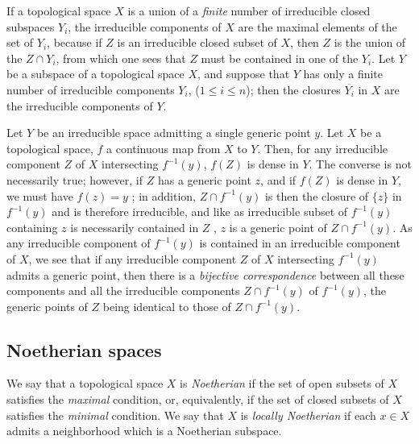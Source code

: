 \begin{env}[2.1.7]
\label{0.2.1.7}
If a topological space $X$ is a union of a {\em finite} number of irreducible
closed subspaces $Y_i$, the irreducible components of $X$ are the maximal
elements of the set of $Y_i$, because if $Z$ is an irreducible closed subset of
$X$, then $Z$ is the union of the $Z\cap Y_i$, from which one sees that $Z$ must
be contained in one of the $Y_i$. Let $Y$ be a subspace of a topological space
$X$, and suppose that $Y$ has only a finite number of irreducible components
$Y_i$, ($1\leqslant i\leqslant n$); then the closures $\overline{Y_i}$ in $X$
are the irreducible components of $Y$.
\end{env}

\begin{env}[2.1.8]
\label{0.2.1.8}
Let $Y$ be an irreducible space admitting a single generic point $y$. Let $X$ be
a topological space, $f$ a continuous map from $X$ to $Y$. Then, for any
irreducible component $Z$ of $X$ intersecting $f^{-1}(y)$, $f(Z)$ is dense in
$Y$. The converse is not necessarily true; however, if $Z$ has a generic point
$z$, and if $f(Z)$ is dense in $Y$, we must have $f(z)=y$ ; in
addition, $Z\cap f^{-1}(y)$ is then the closure of $\{z\}$ in $f^{-1}(y)$ and is
therefore irreducible, and like as irreducible subset of $f^{-1}(y)$ containing
$z$ is necessarily contained in $Z$ , $z$ is a generic point of
$Z\cap f^{-1}(y)$. As any irreducible component of $f^{-1}(y)$ is contained in
an irreducible component of $X$, we see that if any irreducible component $Z$ of
$X$ intersecting $f^{-1}(y)$ admits a generic point, then there is a
{\em bijective correspondence} between all these components and all the
irreducible components $Z\cap f^{-1}(y)$ of $f^{-1}(y)$, the generic points of
$Z$ being identical to those of $Z\cap f^{-1}(y)$.
\end{env}

\subsection{Noetherian spaces}
\label{subsection-noetherian-spaces}

\begin{env}[2.2.1]
\label{0.2.2.1}
We say that a topological space $X$ is {\em Noetherian} if the set of open
subsets of $X$ satisfies the {\em maximal} condition, or, equivalently, if the
set of closed subsets of $X$ satisfies the {\em minimal} condition. We say that
$X$ is {\em locally Noetherian} if each $x\in X$ admits a neighborhood which is
a Noetherian subspace.
\end{env}

